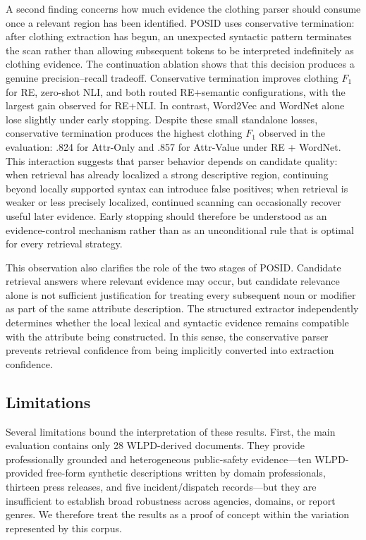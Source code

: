 \documentclass[sigconf,nonacm]{acmart}
\begin{document}
A second finding concerns how much evidence the clothing parser should consume
once a relevant region has been identified. POSID uses conservative
termination: after clothing extraction has begun, an unexpected syntactic
pattern terminates the scan rather than allowing subsequent tokens to be
interpreted indefinitely as clothing evidence. The continuation ablation shows
that this decision produces a genuine precision--recall tradeoff. Conservative
termination improves clothing $F_1$ for RE, zero-shot NLI, and both routed
RE+semantic configurations, with the largest gain observed for RE+NLI. In
contrast, Word2Vec and WordNet alone lose slightly under early stopping.
Despite these small standalone losses, conservative termination produces the
highest clothing $F_1$ observed in the evaluation: .824 for Attr-Only and .857
for Attr-Value under RE + WordNet. This interaction suggests that parser
behavior depends on candidate quality: when retrieval has already localized a
strong descriptive region, continuing beyond locally supported syntax can
introduce false positives; when retrieval is weaker or less precisely
localized, continued scanning can occasionally recover useful later evidence.
Early stopping should therefore be understood as an evidence-control mechanism
rather than as an unconditional rule that is optimal for every retrieval
strategy.

This observation also clarifies the role of the two stages of POSID. Candidate
retrieval answers where relevant evidence may occur, but candidate relevance
alone is not sufficient justification for treating every subsequent noun or
modifier as part of the same attribute description. The structured extractor
independently determines whether the local lexical and syntactic evidence
remains compatible with the attribute being constructed. In this sense, the
conservative parser prevents retrieval confidence from being implicitly
converted into extraction confidence.

\subsection{Limitations}
\label{subsec:limitations}

Several limitations bound the interpretation of these results. First, the main
evaluation contains only 28 WLPD-derived documents. They provide
professionally grounded and heterogeneous public-safety evidence---ten
WLPD-provided free-form synthetic descriptions written by domain
professionals, thirteen press releases, and five incident/dispatch records---but
they are insufficient to establish broad robustness across agencies, domains,
or report genres. We therefore treat the results as a proof of concept within
the variation represented by this corpus.
\end{document}
